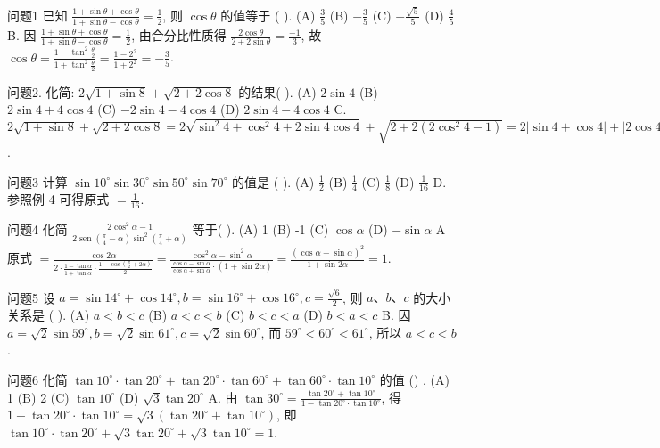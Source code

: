 
问题1 已知 $\frac{1+\sin \theta+\cos \theta}{1+\sin \theta-\cos \theta}=\frac{1}{2}$, 则 $\cos \theta$ 的值等于 ( ).
(A) $\frac{3}{5}$
(B) $-\frac{3}{5}$
(C) $-\frac{\sqrt{5}}{5}$
(D) $\frac{4}{5}$
B. 因 $\frac{1+\sin \theta+\cos \theta}{1+\sin \theta-\cos \theta}=\frac{1}{2}$, 由合分比性质得 $\frac{2 \cos \theta}{2+2 \sin \theta}=\frac{-1}{3}$, 故 $\cos \theta=\frac{1-\tan ^2 \frac{\theta}{2}}{1+\tan ^2 \frac{\theta}{2}}=\frac{1-2^2}{1+2^2}=-\frac{3}{5}$.



问题2. 化简: $2 \sqrt{1+\sin 8}+\sqrt{2+2 \cos 8}$ 的结果( ).
(A) $2 \sin 4$
(B) $2 \sin 4+4 \cos 4$
(C) $-2 \sin 4-4 \cos 4$
(D) $2 \sin 4-4 \cos 4$
C. $2 \sqrt{1+\sin 8}+\sqrt{2+2 \cos 8}=2 \sqrt{\sin ^2 4+\cos ^2 4+2 \sin 4 \cos 4}+ \sqrt{2+2\left(2 \cos ^2 4-1\right)}=2|\sin 4+\cos 4|+|2 \cos 4|=-2 \sin 4-2 \cos 4- 2 \cos 4=-2 \sin 4-4 \cos 4$.



问题3 计算 $\sin 10^{\circ} \sin 30^{\circ} \sin 50^{\circ} \sin 70^{\circ}$ 的值是 ( ).
(A) $\frac{1}{2}$
(B) $\frac{1}{4}$
(C) $\frac{1}{8}$
(D) $\frac{1}{16}$
D. 参照例 4 可得原式 $=\frac{1}{16}$.



问题4 化简 $\frac{2 \cos ^2 \alpha-1}{2 \operatorname{sen}\left(\frac{\pi}{4}-\alpha\right) \sin ^2\left(\frac{\pi}{4}+\alpha\right)}$ 等于( ).
(A) 1
(B) -1
(C) $\cos \alpha$
(D) $-\sin \alpha$
$\mathrm{A}$ 原式 $=\frac{\cos 2 \alpha}{2 \cdot \frac{1-\tan \alpha}{1+\tan \alpha} \cdot \frac{1-\cos \left(\frac{\pi}{2}+2 \alpha\right)}{2}}=\frac{\cos ^2 \alpha-\sin ^2 \alpha}{\frac{\cos \alpha-\sin \alpha}{\cos \alpha+\sin \alpha} \cdot(1+\sin 2 \alpha)}= \frac{(\cos \alpha+\sin \alpha)^2}{1+\sin 2 \alpha}=1$.



问题5 设 $a=\sin 14^{\circ}+\cos 14^{\circ}, b=\sin 16^{\circ}+\cos 16^{\circ}, c=\frac{\sqrt{6}}{2}$, 则 $a 、 b 、 c$ 的大小关系是 ( ).
(A) $a<b<c$
(B) $a<c<b$
(C) $b<c<a$
(D) $b<a<c$
B. 因 $a=\sqrt{2} \sin 59^{\circ}, b=\sqrt{2} \sin 61^{\circ}, c=\sqrt{2} \sin 60^{\circ}$, 而 $59^{\circ}<60^{\circ}<61^{\circ}$, 所以 $a<c<b$.



问题6 化简 $\tan 10^{\circ} \cdot \tan 20^{\circ}+\tan 20^{\circ} \cdot \tan 60^{\circ}+\tan 60^{\circ} \cdot \tan 10^{\circ}$ 的值 () .
(A) 1
(B) 2
(C) $\tan 10^{\circ}$
(D) $\sqrt{3} \tan 20^{\circ}$
A. 由 $\tan 30^{\circ}=\frac{\tan 20^{\circ}+\tan 10^{\circ}}{1-\tan 20^{\circ} \cdot \tan 10^{\circ}}$, 得 $1-\tan 20^{\circ} \cdot \tan 10^{\circ}= \sqrt{3}\left(\tan 20^{\circ}+\tan 10^{\circ}\right)$, 即 $\tan 10^{\circ} \cdot \tan 20^{\circ}+\sqrt{3} \tan 20^{\circ}+\sqrt{3} \tan 10^{\circ}=1$.




